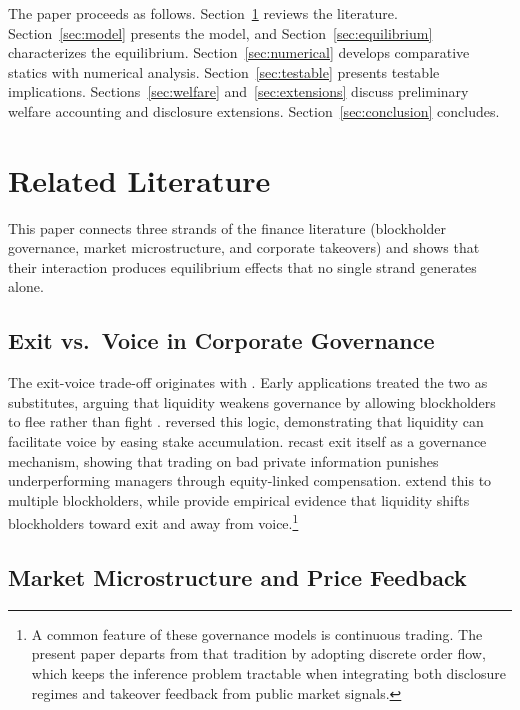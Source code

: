 \documentclass[11pt]{article}
\newcommand{\1}{\mathbf{1}}
\begin{document}
The paper proceeds as follows. Section~\ref{sec:lit} reviews the literature. Section~\ref{sec:model} presents the model, and Section~\ref{sec:equilibrium} characterizes the equilibrium. Section~\ref{sec:numerical} develops comparative statics with numerical analysis. Section~\ref{sec:testable} presents testable implications. Sections~\ref{sec:welfare} and~\ref{sec:extensions} discuss preliminary welfare accounting and disclosure extensions. Section~\ref{sec:conclusion} concludes.
\section{Related Literature}
\label{sec:lit}

This paper connects three strands of the finance literature (blockholder governance, market microstructure, and corporate takeovers) and shows that their interaction produces equilibrium effects that no single strand generates alone.

%
\subsection{Exit vs.\ Voice in Corporate Governance}
%

The exit-voice trade-off originates with \citet{Hirschman1970}. Early applications treated the two as substitutes, arguing that liquidity weakens governance by allowing blockholders to flee rather than fight \citep{Coffee1991,Bhide1993}. \citet{Maug1998} reversed this logic, demonstrating that liquidity can facilitate voice by easing stake accumulation. \citet{Edmans2009} recast exit itself as a governance mechanism, showing that trading on bad private information punishes underperforming managers through equity-linked compensation. \citet{EdmansManso2011} extend this to multiple blockholders, while \citet{EdmansFangZur2013} provide empirical evidence that liquidity shifts blockholders toward exit and away from voice.\footnote{A common feature of these governance models is continuous trading. The present paper departs from that tradition by adopting discrete order flow, which keeps the inference problem tractable when integrating both disclosure regimes and takeover feedback from public market signals.}

%
\subsection{Market Microstructure and Price Feedback}
%
\end{document}
